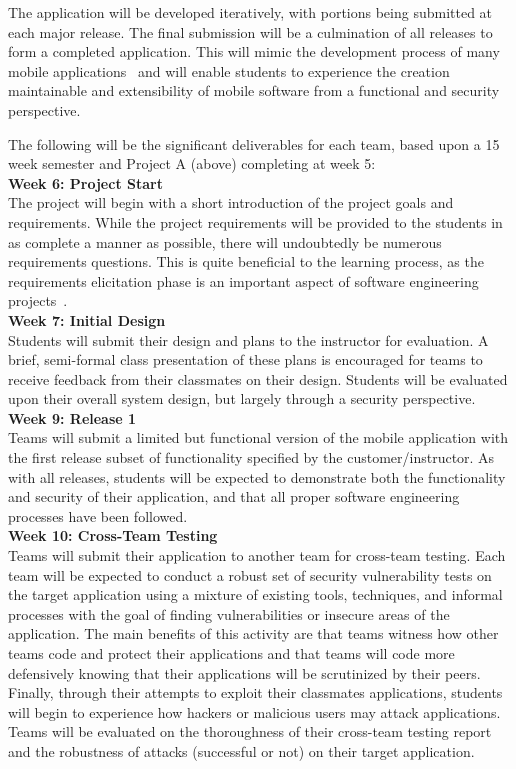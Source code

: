 \documentclass{sig-alternate}
\begin{document}
The application will be developed iteratively, with portions being submitted at each major release. The final submission will be a culmination of all releases to form a completed application. This will mimic the development process of many mobile applications~\cite{Abrahamsson:2004:MAA:1028664.1028736,Scharff:2010:SSM:1833310.1833315} and will enable students to experience the creation maintainable and extensibility of mobile software from a functional and security perspective.

The following will be the significant deliverables for each team, based upon a 15 week semester and Project A (above) completing at week 5: \\

\textbf{Week 6: Project Start}\\
The project will begin with a short introduction of the project goals and requirements. While the project requirements will be provided to the students in as complete a manner as possible, there will undoubtedly be numerous requirements questions. This is quite beneficial to the learning process, as the requirements elicitation phase is an important aspect of software engineering projects~\cite{pressman}. \\

\textbf{Week 7: Initial Design}\\
Students will submit their design and plans to the instructor for evaluation. A brief, semi-formal class presentation of these plans is encouraged for teams to receive feedback from their classmates on their design. Students will be evaluated upon their overall system design, but largely through a security perspective. \\

\textbf{Week 9: Release 1}\\
Teams will submit a limited but functional version of the mobile application with the first release subset of functionality specified by the customer/instructor. As with all releases, students will be expected to demonstrate both the functionality and security of their application, and that all proper software engineering processes have been followed. \\

\textbf{Week 10: Cross-Team Testing}\\
Teams will submit their application to another team for cross-team testing. Each team will be expected to conduct a robust set of security vulnerability tests on the target application using a mixture of existing tools, techniques, and informal processes with the goal of finding vulnerabilities or insecure areas of the application. The main benefits of this activity are that teams witness how other teams code and protect their applications and that teams will code more defensively knowing that their applications will be scrutinized by their peers. Finally, through their attempts to exploit their classmates applications, students will begin to experience how hackers or malicious users may attack applications. Teams will be evaluated on the thoroughness of their cross-team testing report and the robustness of attacks (successful or not) on their target application. \\
	
\end{document}
